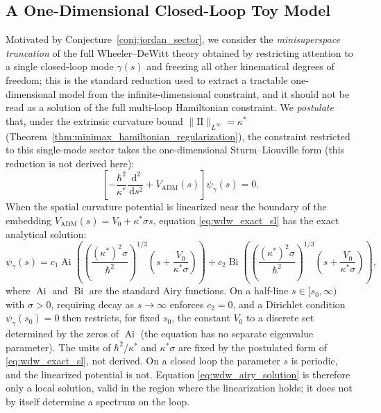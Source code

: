 \documentclass[11pt,a4paper,reqno]{amsart}
\theoremstyle{definition}
\numberwithin{equation}{section}
\providecommand{\II}{\mathrm{I\!I}}
\newcommand{\dif}{\,\mathrm{d}}
\providecommand{\II}{\mathrm{II}}
\begin{document}
\subsection{A One-Dimensional Closed-Loop Toy Model}
Motivated by Conjecture~\ref{conj:jordan_sector}, we consider the \emph{minisuperspace truncation} of the full Wheeler--DeWitt theory obtained by restricting attention to a single closed-loop mode $\gamma(s)$ and freezing all other kinematical degrees of freedom; this is the standard reduction used to extract a tractable one-dimensional model from the infinite-dimensional constraint, and it should not be read as a solution of the full multi-loop Hamiltonian constraint. We \emph{postulate} that, under the extrinsic curvature bound $\|\II\|_{L^\infty} = \kappa^*$ (Theorem~\ref{thm:minimax_hamiltonian_regularization}), the constraint restricted to this single-mode sector takes the one-dimensional Sturm--Liouville form (this reduction is not derived here):
\begin{equation}
    \label{eq:wdw_exact_sl}
    \left[ -\frac{\hbar^2}{\kappa^*} \frac{\dif^2}{\dif s^2} + V_{\mathrm{ADM}}(s) \right] \psi_\gamma(s) = 0.
\end{equation}
When the spatial curvature potential is linearized near the boundary of the embedding $V_{\mathrm{ADM}}(s) = V_0 + \kappa^* \sigma s$, equation \eqref{eq:wdw_exact_sl} has the exact analytical solution:
\begin{equation}
    \label{eq:wdw_airy_solution}
    \psi_\gamma(s) = c_1 \operatorname{Ai}\left( \left(\frac{(\kappa^*)^2 \sigma}{\hbar^2}\right)^{1/3} \left( s + \frac{V_0}{\kappa^* \sigma} \right) \right) + c_2 \operatorname{Bi}\left( \left(\frac{(\kappa^*)^2 \sigma}{\hbar^2}\right)^{1/3} \left( s + \frac{V_0}{\kappa^* \sigma} \right) \right),
\end{equation}
where $\operatorname{Ai}$ and $\operatorname{Bi}$ are the standard Airy functions. On a half-line $s \in [s_0,\infty)$ with $\sigma > 0$, requiring decay as $s \to \infty$ enforces $c_2 = 0$, and a Dirichlet condition $\psi_\gamma(s_0) = 0$ then restricts, for fixed $s_0$, the constant $V_0$ to a discrete set determined by the zeros of $\operatorname{Ai}$ (the equation has no separate eigenvalue parameter). The units of $\hbar^2/\kappa^*$ and $\kappa^*\sigma$ are fixed by the postulated form of \eqref{eq:wdw_exact_sl}, not derived. On a closed loop the parameter $s$ is periodic, and the linearized potential is not. Equation \eqref{eq:wdw_airy_solution} is therefore only a local solution, valid in the region where the linearization holds; it does not by itself determine a spectrum on the loop.
\end{document}
